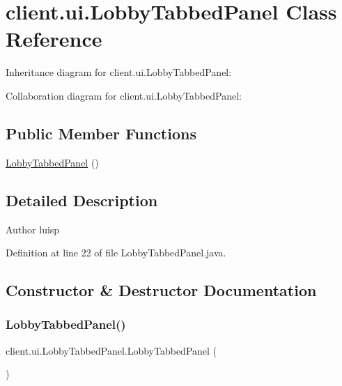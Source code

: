 \hypertarget{classclient_1_1ui_1_1_lobby_tabbed_panel}{}\section{client.\+ui.\+Lobby\+Tabbed\+Panel Class Reference}
\label{classclient_1_1ui_1_1_lobby_tabbed_panel}


Inheritance diagram for client.\+ui.\+Lobby\+Tabbed\+Panel\+:


Collaboration diagram for client.\+ui.\+Lobby\+Tabbed\+Panel\+:
\subsection*{Public Member Functions}
\begin{DoxyCompactItemize}
\item 
\hyperlink{classclient_1_1ui_1_1_lobby_tabbed_panel_ace5183afecd36f1f1cc30483249ee952}{Lobby\+Tabbed\+Panel} ()
\end{DoxyCompactItemize}


\subsection{Detailed Description}
\begin{DoxyAuthor}{Author}
luisp 
\end{DoxyAuthor}


Definition at line 22 of file Lobby\+Tabbed\+Panel.\+java.



\subsection{Constructor \& Destructor Documentation}
\hypertarget{classclient_1_1ui_1_1_lobby_tabbed_panel_ace5183afecd36f1f1cc30483249ee952}{}\label{classclient_1_1ui_1_1_lobby_tabbed_panel_ace5183afecd36f1f1cc30483249ee952} 
\subsubsection{\texorpdfstring{Lobby\+Tabbed\+Panel()}{LobbyTabbedPanel()}}
{\footnotesize\ttfamily client.\+ui.\+Lobby\+Tabbed\+Panel.\+Lobby\+Tabbed\+Panel (\begin{DoxyParamCaption}{ }\end{DoxyParamCaption})}

